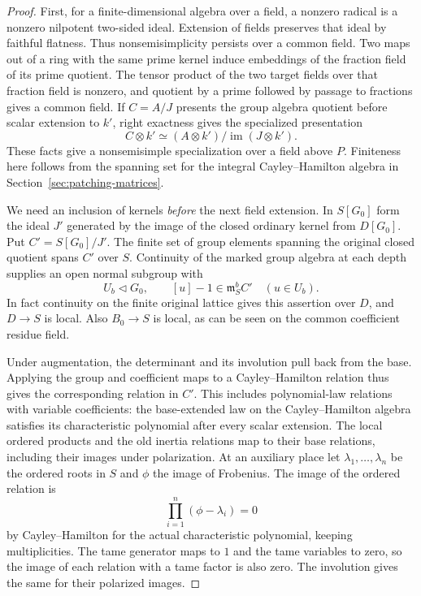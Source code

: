 \begin{proof}
First, for a finite-dimensional algebra over a field, a nonzero
radical is a nonzero nilpotent two-sided ideal. Extension of fields
preserves that ideal by faithful flatness. Thus nonsemisimplicity
persists over a common field. Two maps out of a ring with the same
prime kernel induce embeddings of the fraction field of its prime
quotient. The tensor product of the two target fields over that
fraction field is nonzero, and quotient by a prime followed by
passage to fractions gives a common field. If \(C=A/J\) presents the group algebra quotient before scalar extension to \(k'\), right exactness gives the specialized presentation
\[
 C\otimes k'\simeq (A\otimes k')/\operatorname{im}(J\otimes k').
\] These facts
give a nonsemisimple specialization over a field above \(P\). Finiteness here
follows from the spanning set for the integral Cayley--Hamilton
algebra in Section~\ref{sec:patching-matrices}.

We need an inclusion of kernels \emph{before} the next field
extension. In \(S[G_0]\) form the ideal \(J'\) generated by the
image of the closed ordinary kernel from \(D[G_0]\). Put
\(C'=S[G_0]/J'\). The finite set of group elements spanning the
original closed quotient spans \(C'\) over \(S\). Continuity of the marked group algebra at each depth supplies an open normal subgroup with
\[
 U_b\triangleleft G_0,\qquad [u]-1\in\mathfrak m_S^b C'\quad(u\in U_b).
\]
In fact continuity on the finite original lattice gives this
assertion over \(D\), and \(D\to S\) is local. Also \(B_0\to S\)
is local, as can be seen on the common coefficient residue field.

Under augmentation, the determinant and its involution pull back from
the base. Applying the group and coefficient maps to a
Cayley--Hamilton relation thus gives the corresponding relation in
\(C'\). This includes polynomial-law relations with variable
coefficients: the base-extended law on the Cayley--Hamilton algebra
satisfies its characteristic polynomial after every scalar extension.
The local ordered products and the old inertia relations map to their
base relations, including their images under polarization. At an auxiliary place let \(\lambda_1,\dots,\lambda_n\)
be the ordered roots in \(S\) and \(\phi\) the image of
Frobenius. The image of the ordered relation is
\[
            \prod_{i=1}^{n}(\phi-\lambda_i)=0
\]
by Cayley--Hamilton for the actual characteristic
polynomial, keeping multiplicities. The tame generator
maps to \(1\) and the tame variables to zero, so the
image of each relation with a tame factor is also zero.
The involution gives the same for their polarized images.


\end{proof}
